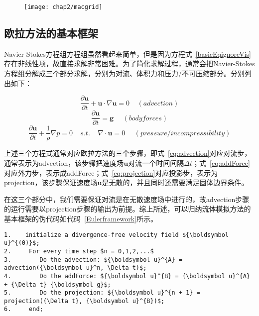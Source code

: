 \begin{figure}
  \centering
   \texttt{[image: chap2/macgrid]}
\end{figure}

\subsection{欧拉方法的基本框架}

Navier-Stokes方程组方程组虽然看起来简单，但是因为方程式~\ref{basicEqignoreVis}存在非线性项，故直接求解非常困难。为了简化求解过程，通常会把Navier-Stokes方程组分解成三个部分求解，分别为对流、体积力和压力/不可压缩部分。分别列出如下：

\begin{equation}
\label{eq:advection}
\frac{\partial {\boldsymbol u}}{\partial t} + {\boldsymbol u} \cdot \nabla {\boldsymbol u} = 0  \ \ \ \ \ (advection)
\end{equation}
\begin{equation}
\label{eq:addForce}
\frac{\partial {\boldsymbol u}}{\partial t} = {\boldsymbol g}  \ \ \ \ \ \ (body forces)
\end{equation}
\begin{equation}
\label{eq:projection}
\frac{\partial {\boldsymbol u}}{\partial t} + \frac{1}{\rho} \nabla p= 0 
\ \ \ \ \ 
 s.t. \ \ \ \ \ 
 \nabla \cdot {\boldsymbol u} = 0 \ \ \ \ \ \ (pressure/incompressibility)
\end{equation}

上述三个方程式通常对应欧拉方法的三个步骤，即式~\ref{eq:advection}对应对流步，通常表示为advection，该步骤把速度场\({\boldsymbol u}\)对流一个时间间隔\(\Delta t\)；式~\ref{eq:addForce}对应外力步，表示成addForce；式~\ref{eq:projection}对应投影步，表示为projection，该步骤保证速度场\({\boldsymbol u}\)是无散的，并且同时还需要满足固体边界条件。

在这三个部分中，我们需要保证对流是在无散速度场中进行的，故advection步骤的运行需要以projection步骤的输出为前提。综上所述，可以归纳流体模拟方法的基本框架的伪代码如代码~\ref{Eulerframework}所示。

\begin{lstlisting}[caption={流体模拟的基本框架伪代码}, escapeinside="", numbers=none, label={Eulerframework}]
1.    initialize a divergence-free velocity field ${\boldsymbol u}^{(0)}$;
2.     For every time step $n = 0,1,2,...$
3.        Do the advection: ${\boldsymbol u}^{A} = advection({\boldsymbol u}^n, \Delta t)$;
4.        Do the addForce: ${\boldsymbol u}^{B} = {\boldsymbol u}^{A} + {\Delta t} {\boldsymbol g}$;
5.        Do the projection: ${\boldsymbol u}^{n + 1} = projection({\Delta t}, {\boldsymbol u}^{B})$;
6.     end;
\end{lstlisting}

